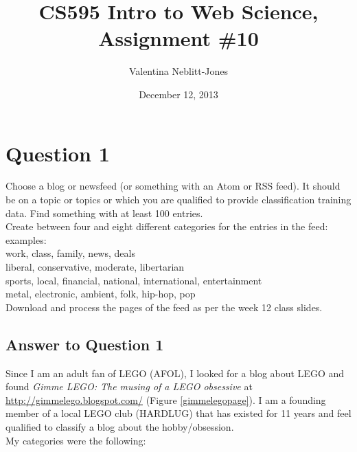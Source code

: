 \documentclass{article}
\begin{document}
\title{CS595 Intro to Web Science, Assignment \#10}
\author{Valentina Neblitt-Jones}
\date{December 12, 2013}
\maketitle

\newpage
\lstlistoflistings
\listoffigures

\newpage
\section*{Question 1}

Choose a blog or newsfeed (or something with an Atom or RSS feed). It should be on a topic or topics or which you are qualified to provide classification training data. Find something with at least 100 entries. \\

Create between four and eight different categories for the entries in the feed: \\

examples: \\

work, class, family, news, deals \\

liberal, conservative, moderate, libertarian \\

sports, local, financial, national, international, entertainment \\

metal, electronic, ambient, folk, hip-hop, pop \\

Download and process the pages of the feed as per the week 12 class slides.

\subsection*{Answer to Question 1}

Since I am an adult fan of LEGO (AFOL), I looked for a blog about LEGO and found \textit{Gimme LEGO: The musing of a LEGO obsessive} at \url{http://gimmelego.blogspot.com/} (Figure \ref{gimmelegopage}). I am a founding member of a local LEGO club (HARDLUG) that has existed for 11 years and feel qualified to classify a blog about the hobby/obsession. \\

My categories were the following:
\end{document}
